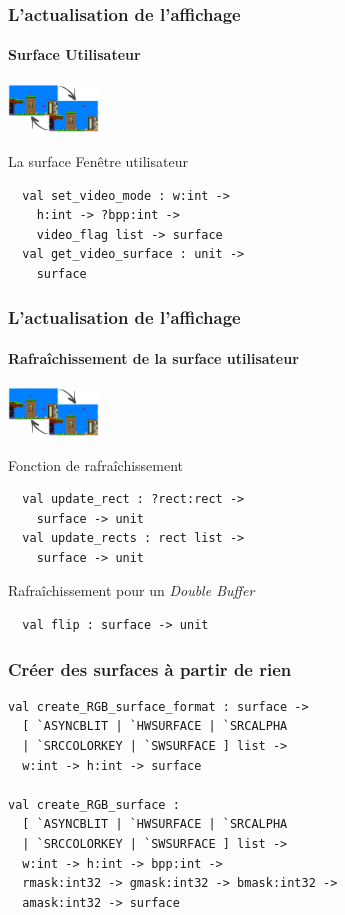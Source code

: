 \begin{frame}[fragile]
	\frametitle{L'actualisation de l'affichage}
	\framesubtitle{Surface Utilisateur}
	\begin{center}
		\includegraphics[width=2.4cm]{pics/doubleBufferScreen.png}
	\end{center}
	\begin{block}{La surface \og{}Fenêtre utilisateur\fg}
		\begin{lstlisting}
  val set_video_mode : w:int -> 
    h:int -> ?bpp:int -> 
    video_flag list -> surface
  val get_video_surface : unit -> 
    surface
		\end{lstlisting}
	\end{block}
	
\end{frame}

\begin{frame}[fragile]
	\frametitle{L'actualisation de l'affichage}
	\framesubtitle{Rafraîchissement de la surface utilisateur}
	\begin{center}
		\includegraphics[width=2.4cm]{pics/doubleBufferScreen.png}
	\end{center}
	\begin{block}{Fonction de rafraîchissement}
		\begin{lstlisting}
  val update_rect : ?rect:rect -> 
    surface -> unit
  val update_rects : rect list -> 
    surface -> unit
		\end{lstlisting}
	\end{block}
	\begin{block}{Rafraîchissement pour un \textit{Double Buffer}}
		\begin{lstlisting}
  val flip : surface -> unit
		\end{lstlisting}
	\end{block}
\end{frame}

\begin{frame}[fragile]
	\frametitle{Créer des surfaces à partir de rien}
	\lstset{basicstyle=\footnotesize}
	\begin{lstlisting}
val create_RGB_surface_format : surface ->
  [ `ASYNCBLIT | `HWSURFACE | `SRCALPHA 
  | `SRCCOLORKEY | `SWSURFACE ] list ->
  w:int -> h:int -> surface

val create_RGB_surface : 
  [ `ASYNCBLIT | `HWSURFACE | `SRCALPHA 
  | `SRCCOLORKEY | `SWSURFACE ] list ->
  w:int -> h:int -> bpp:int ->
  rmask:int32 -> gmask:int32 -> bmask:int32 ->
  amask:int32 -> surface
	\end{lstlisting}
\end{frame}

